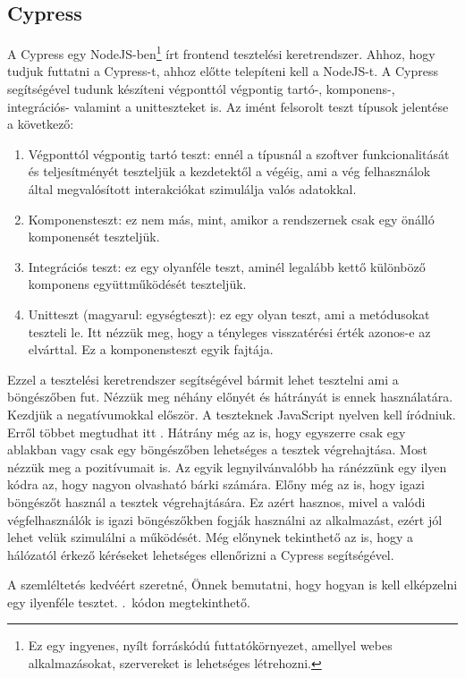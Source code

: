 \documentclass[]{thesis-ekf}
\theoremstyle{definition}
\theoremstyle{remark}
\begin{document}
	\subsection{Cypress}
		A Cypress egy NodeJS-ben\footnote{Ez egy ingyenes, nyílt forráskódú futtatókörnyezet, amellyel webes alkalmazásokat, szervereket is lehetséges létrehozni.} írt frontend tesztelési keretrendszer. Ahhoz, hogy tudjuk futtatni a Cypress-t, ahhoz előtte telepíteni kell a NodeJS-t. A Cypress segítségével tudunk készíteni végponttól végpontig tartó-, komponens-, integrációs- valamint a unitteszteket is.
		Az imént felsorolt teszt típusok jelentése a következő:
		\begin{enumerate}
			\item Végponttól végpontig tartó teszt: ennél a típusnál a szoftver funkcionalitását és teljesítményét teszteljük a kezdetektől a végéig, ami a vég felhasználok által megvalósított interakciókat szimulálja valós adatokkal.
			\item Komponensteszt: ez nem más, mint, amikor a rendszernek csak egy önálló komponensét teszteljük.
			\item Integrációs teszt: ez egy olyanféle teszt, aminél legalább kettő különböző komponens együttműködését teszteljük.
			\item Unitteszt (magyarul: egységteszt): ez egy olyan teszt, ami a metódusokat teszteli le. Itt nézzük meg, hogy a tényleges visszatérési érték azonos-e az elvárttal. Ez a komponensteszt egyik fajtája.
		\end{enumerate}
		Ezzel a tesztelési keretrendszer segítségével bármit lehet tesztelni ami a böngészőben fut. Nézzük meg néhány előnyét és hátrányát is ennek használatára. Kezdjük a negatívumokkal először. A teszteknek JavaScript nyelven kell íródniuk. Erről többet megtudhat itt . Hátrány még az is, hogy egyszerre csak egy ablakban vagy csak egy böngészőben lehetséges a tesztek végrehajtása. Most nézzük meg a pozitívumait is. Az egyik legnyilvánvalóbb ha ránézzünk egy ilyen kódra az, hogy nagyon olvasható bárki számára. Előny még az is, hogy igazi böngészőt használ a tesztek végrehajtására. Ez azért hasznos, mivel a valódi végfelhasználók is igazi böngészőkben fogják használni az alkalmazást, ezért jól lehet velük szimulálni a működését. Még előnynek tekinthető az is, hogy a hálózatól érkező kéréseket lehetséges ellenőrizni a Cypress segítségével.
		\cite{Kusper Szoftvertesztles, Cypress, Katalon, Medium, NodeJS}
		
		A szemléltetés kedvéért szeretné, Önnek bemutatni, hogy hogyan is kell elképzelni egy ilyenféle tesztet. .~kódon megtekinthető.
		
\end{document}
